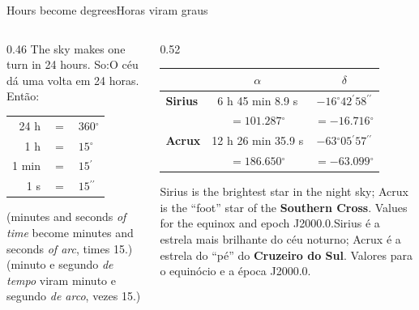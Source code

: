 \documentclass[aspectratio=169,11pt]{beamer}
\newcommand{\tr}[2]{\ifEN#2\else#1\fi}
\newcommand{\bnum}[1]{\textbf{\textcolor{mTeal}{#1}}}
\newcommand{\asec}{\ensuremath{{}^{\prime\prime}}}
\newcommand{\amin}{\ensuremath{{}^{\prime}}}
\newcommand{\gr}{\ensuremath{{}^{\circ}}}
\begin{document}
\begin{frame}{\tr{Horas viram graus}{Hours become degrees}}
  \begin{columns}[T]
    \begin{column}{0.46\textwidth}
      \tr{O céu dá uma volta em 24 horas. Então:}{The sky makes one turn in 24 hours. So:}
      \medskip
      \centering
      \renewcommand{\arraystretch}{1.35}
      \begin{tabular}{rcl}
        \toprule
        24 h & $=$ & $360\gr$ \\
        1 h & $=$ & $15\gr$ \\
        1 min & $=$ & $15\amin$ \\
        1 s & $=$ & $15\asec$ \\
        \bottomrule
      \end{tabular}
      \par\medskip
      \raggedright
      {\small\tr{(minuto e segundo \emph{de tempo} viram minuto e segundo \emph{de arco}, vezes
      15.)}{(minutes and seconds \emph{of time} become minutes and seconds \emph{of arc},
      times 15.)}}
    \end{column}
    \begin{column}{0.52\textwidth}
      \centering
      \small
      \renewcommand{\arraystretch}{1.4}
      \begin{tabular}{lcc}
        \toprule
        & \textcolor{corTempo}{$\alpha$} & \textcolor{corErro}{$\delta$} \\
        \midrule
        \textbf{Sirius} & 6 h 45 min \num{8.9} s & $-16\gr42\amin58\asec$ \\
        & $=\num{101.287}\gr$ & $=\num{-16.716}\gr$ \\
        \midrule
        \textbf{Acrux} & 12 h 26 min \num{35.9} s & $-63\gr05\amin57\asec$ \\
        & $=\num{186.650}\gr$ & $=\num{-63.099}\gr$ \\
        \bottomrule
      \end{tabular}
      \par\medskip
      \raggedright
      {\footnotesize\tr{Sirius é a estrela mais brilhante do céu noturno; Acrux é a estrela do
      ``pé'' do \bnum{Cruzeiro do Sul}. Valores para o equinócio e a época J2000.0.}{Sirius is the
      brightest star in the night sky; Acrux is the ``foot'' star of the \bnum{Southern
      Cross}. Values for the equinox and epoch J2000.0.}}
    \end{column}
  \end{columns}
\end{frame}
\end{document}
